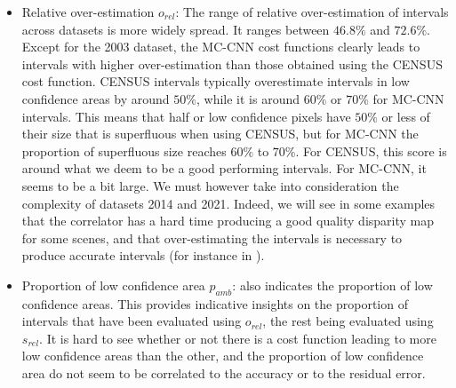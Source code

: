 \begin{itemize}
    \item Relative over-estimation $o_{rel}$: The range of relative over-estimation of intervals across datasets is more widely spread. It ranges between $46.8\%$ and $72.6\%$. Except for the 2003 dataset, the MC-CNN cost functions clearly leads to intervals with higher over-estimation than those obtained using the CENSUS cost function. CENSUS intervals typically overestimate intervals in low confidence areas by around $50\%$, while it is around $60\%$ or $70\%$ for MC-CNN intervals. This means that half or low confidence pixels have $50\%$ or less of their size that is superfluous when using CENSUS, but for MC-CNN the proportion of superfluous size reaches $60\%$ to $70\%$. For CENSUS, this score is around what we deem to be a good performing intervals. For MC-CNN, it seems to be a bit large. We must however take into consideration the complexity of datasets 2014 and 2021. Indeed, we will see in some examples that the correlator has a hard time producing a good quality disparity map for some scenes, and that over-estimating the intervals is necessary to produce accurate intervals (for instance in ).
    
    \item Proportion of low confidence area $p_{amb}$:  also indicates the proportion of low confidence areas. This provides indicative insights on the proportion of intervals that have been evaluated using $o_{rel}$, the rest being evaluated using $s_{rel}$. It is hard to see whether or not there is a cost function leading to more low confidence areas than the other, and the proportion of low confidence area do not seem to be correlated to the accuracy or to the residual error.
\end{itemize}

